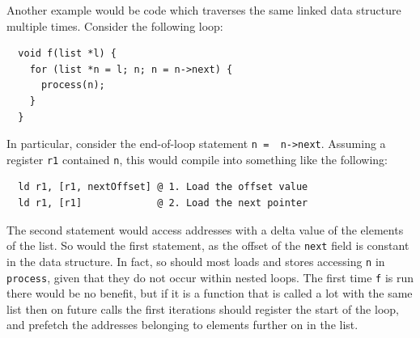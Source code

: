 Another example would be code which traverses the same linked data
structure multiple times. Consider the following loop:
\begin{lstlisting}
  void f(list *l) {
    for (list *n = l; n; n = n->next) {
      process(n);
    }
  }
\end{lstlisting}
In particular, consider the end-of-loop statement {\lstinline|n =  n->next|}. 
Assuming a register {\lstinline|r1|} contained {\lstinline|n|}, this
would compile into something like the following:
\begin{lstlisting}
  ld r1, [r1, nextOffset] @ 1. Load the offset value
  ld r1, [r1]             @ 2. Load the next pointer
\end{lstlisting}
The second statement would access addresses with a delta value of the
elements of the list. So would the first statement, as the offset of
the {\lstinline|next|} field is constant in the data structure. In
fact, so should most loads and stores accessing {\lstinline|n|} in
{\lstinline|process|}, given that they do not occur within nested
loops. The first time {\lstinline|f|} is run there would be no
benefit, but if it is a function that is called a lot with the same
list then on future calls the first iterations should register the
start of the loop, and prefetch the addresses belonging to elements
further on in the list.
